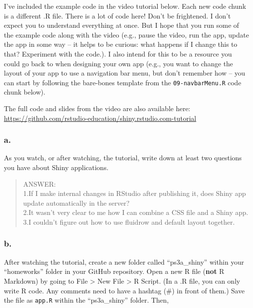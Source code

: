 \documentclass[
]{article}
\begin{document}
I've included the example code in the video tutorial below. Each new
code chunk is a different .R file. There is a lot of code here! Don't be
frightened. I don't expect you to understand everything at once. But I
hope that you run some of the example code along with the video (e.g.,
pause the video, run the app, update the app in some way -- it helps to
be curious: what happens if I change this to that? Experiment with the
code.). I also intend for this to be a resource you could go back to
when designing your own app (e.g., you want to change the layout of your
app to use a navigation bar menu, but don't remember how -- you can
start by following the bare-bones template from the
\texttt{09-navbarMenu.R} code chunk below).

The full code and slides from the video are also available here:
\url{https://github.com/rstudio-education/shiny.rstudio.com-tutorial}

\hypertarget{a.}{%
\subsubsection{a.}\label{a.}}

As you watch, or after watching, the tutorial, write down at least two
questions you have about Shiny applications.

\begin{quote}
ANSWER:\\
1.If I make internal changes in RStudio after publishing it, does Shiny
app update automatically in the server?\\
2.It wasn't very clear to me how I can combine a CSS file and a Shiny
app.\\
3.I couldn't figure out how to use fluidrow and default layout together.
\end{quote}

\hypertarget{b.}{%
\subsubsection{b.}\label{b.}}

After watching the tutorial, create a new folder called ``ps3a\_shiny''
within your ``homeworks'' folder in your GitHub repository. Open a new R
file (\textbf{not} R Markdown) by going to File \textgreater{} New File
\textgreater{} R Script. (In a .R file, you can only write R code. Any
comments need to have a hashtag (\#) in front of them.) Save the file as
\texttt{app.R} within the ``ps3a\_shiny'' folder. Then,
\end{document}
